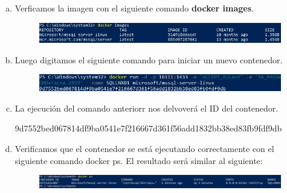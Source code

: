 \documentclass[preprint,12pt]{elsarticle}
\begin{document}
\begin{enumerate}[a)]
\item Verficamos la imagen con el siguiente comando \textbf{docker images}.
\begin{figure}[htb]
	\begin{center}
		\includegraphics[width=14cm]{./IMAGENES/Docker06}
	\end{center}
\end{figure}

\item Luego digitamos el siguiente comando para iniciar un nuevo contenedor. 
\begin{figure}[htb]
	\begin{center}
		\includegraphics[width=14cm]{./IMAGENES/Docker07}
	\end{center}
\end{figure}

\item La ejecución del comando anteriorr nos delvoverá el ID del contenedor.
\begin{center}
9d7552bed067814df9ba0541e7f216667d361f56add1832bb38ed83fb9fdf9db
\end{center}

\item Verificamos que el contenedor se está ejecutando correctamente con el siguiente comando docker ps. El resultado será similar al siguiente:
\begin{figure}[htb]
	\begin{center}
		\includegraphics[width=14cm]{./IMAGENES/Docker08}
	\end{center}
\end{figure}


\end{enumerate}
\end{document}
